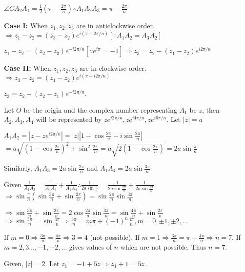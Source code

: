   $\angle CA_2A_1 = \frac{1}{2}\left(\pi - \frac{2\pi}{n}\right) \therefore A_1A_2A_3 = \pi - \frac{2\pi}{n}$

  {\bf Case I:} When $z_1, z_2, z_3$ are in anticlockwise order. $\Rightarrow z_1 - z_2 = (z_3 - z_2)e^{i\left(\pi -
    2\pi/n\right)}[\because A_1A_2 = A_3A_2]$

  $z_1 - z_2 = (z_2 - z_3)e^{-i2\pi/n}[\because e^{i\pi} = -1] \Rightarrow z_3 = z_2 - (z_1 - z_2)e^{i2\pi/n}$

  {\bf Case II:} When $z_1, z_2, z_3$ are in clockwise order. $\Rightarrow z_3 - z_2 = (z_1 - z_2)e^{i\left(\pi -
    i2\pi/n\right)}$

  $z_3 = z_2 + (z_2 - z_1)e^{-i2\pi/n}$.
\item Let $O$ be the origin and the complex number representing $A_1$ be $z$, then $A_2, A_3, A_4$ will be
  represented by $ze^{i2\pi/n}, ze^{i4\pi/n}, ze^{i6\pi/n}$. Let $|z| = a$

  $A_1A_2 = \left|z - ze^{i2\pi/n}\right| = |z|\left|1 - \cos\frac{2\pi}{n} - i\sin\frac{2\pi}{n}\right|$
  $= a\sqrt{\left(1 - \cos\frac{2\pi}{n}\right)^2 + \sin^2\frac{2\pi}{n}} = a\sqrt{2\left(1 -
    \cos\frac{2\pi}{n}\right)} = 2a\sin\frac{\pi}{n}$

  Similarly, $A_1A_3 = 2a\sin\frac{2\pi}{n}$ and $A_1A_4 = 2a\sin\frac{3\pi}{n}$

  Given $\frac{1}{A_1A_2} = \frac{1}{A_1A_3} + \frac{1}{A_1A_4}\therefore \frac{1}{2a\sin\frac{\pi}{n}} =
  \frac{1}{2a\sin\frac{2\pi}{n}} + \frac{1}{2a\sin\frac{3\pi}{n}}$
  $\Rightarrow \sin\frac{\pi}{n}\left(\sin\frac{3\pi}{n} + \sin\frac{2\pi}{n}\right) =
  \sin\frac{2\pi}{n}\sin\frac{3\pi}{n}$

  $\Rightarrow \sin\frac{3\pi}{n} + \sin\frac{2\pi}{n} = 2\cos\frac{2\pi}{n}\sin\frac{3\pi}{n} =
  \sin\frac{4\pi}{n} + \sin\frac{2\pi}{n}$
  $\Rightarrow \sin\frac{3\pi}{n} = \sin\frac{4\pi}{n}\Rightarrow \frac{3\pi}{n} = m\pi +
  (-1)^n\frac{4\pi}{n}, m = 0,\pm1, \pm2,\ldots$

  If $m = 0\Rightarrow \frac{3\pi}{n} = \frac{4\pi}{n} \Rightarrow 3 = 4$ (not possible).
  If $m = 1\Rightarrow \frac{3\pi}{n} = \pi - \frac{4\pi}{n}\Rightarrow n = 7$.
  If $m = 2,3 \ldots, -1, -2,\ldots$ gives values of $n$ which are not possible. Thus $n = 7$.
\item Given, $|z| = 2$. Let $z_1 = -1 + 5z \Rightarrow z_1 + 1 = 5z$.

